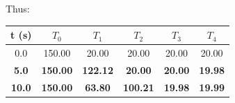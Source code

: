 \documentclass[calculator,steamtables,datasheet,solutions]{exam_newMarcus2}
\begin{document}
\begin{question}
\begin{enumerate}
{Thus:~
\begin{center}
\begin{tabular}{c | c c c c c }
{\bf t (s)}  &  $T_{0}$  &  $T_{1}$  &  $T_{2}$  &  $T_{3}$  &  $T_{4}$  \\
\hline
0.0          &  150.00  &  20.00    &  20.00   &  20.00   &  20.00  \\
{\bf 5.0 }         &  {\bf 150.00 }  &  {\bf 122.12 }   &  {\bf 20.00 }   &  {\bf 20.00 }   &  {\bf 19.98 }  \\
{\bf 10.0  }        &  {\bf 150.00 }  &  {\bf 63.80 }    &  {\bf 100.21 }   &  {\bf 19.98 }   &  {\bf 19.99 } 
\end{tabular}
\end{center}
}




\end{enumerate}

\end{question}


\clearpage
\end{document}
